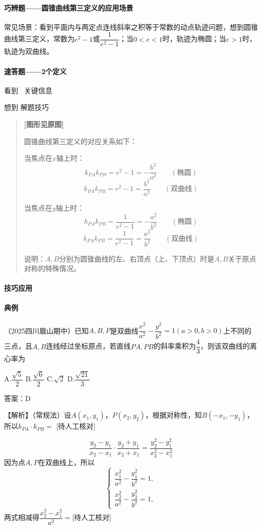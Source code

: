 \documentclass[UTF8,a4paper,11pt]{ctexart}
\begin{document}
\paragraph{巧辨题——圆锥曲线第三定义的应用场景}
常见场景：看到平面内与两定点连线斜率之积等于常数的动点轨迹问题，想到圆锥曲线第三定义，常数为$e^2-1$或$\dfrac{1}{e^2-1}$；当$0<e<1$时，轨迹为椭圆；当$e>1$时，轨迹为双曲线。

\paragraph{速答题——2个定义}
看到 \textbullet\ 关键信息

想到 解题技巧

\begin{quote}
\textbf{[图形见原图]}

圆锥曲线第三定义的对应关系如下：

当焦点在$x$轴上时：
\[
k_{PA}k_{PB}=e^2-1=-\frac{b^2}{a^2}\qquad(\text{椭圆})
\]
\[
k_{PA}k_{PB}=e^2-1=\frac{b^2}{a^2}\qquad(\text{双曲线})
\]

当焦点在$y$轴上时：
\[
k_{PA}k_{PB}=\frac{1}{e^2-1}=-\frac{a^2}{b^2}\qquad(\text{椭圆})
\]
\[
k_{PA}k_{PB}=\frac{1}{e^2-1}=\frac{a^2}{b^2}\qquad(\text{双曲线})
\]

说明：$A,B$分别为圆锥曲线的左、右顶点（上、下顶点）时是$A,B$关于原点对称的特殊情况。
\end{quote}

\paragraph{技巧应用}
\paragraph{典例}
（2025四川眉山期中）已知$A,B,P$是双曲线$\dfrac{x^2}{a^2}-\dfrac{y^2}{b^2}=1(a>0,b>0)$上不同的三点，且$A,B$连线经过坐标原点，若直线$PA,PB$的斜率乘积为$\dfrac{4}{3}$，则该双曲线的离心率为

A.$\dfrac{\sqrt{5}}{2}$ \qquad B.$\dfrac{\sqrt{6}}{2}$ \qquad C.$\sqrt{2}$ \qquad D.$\dfrac{\sqrt{21}}{3}$

答案：D

【解析】（常规法）设$A(x_1,y_1)$，$P(x_2,y_2)$，根据对称性，知$B(-x_1,-y_1)$，所以$k_{PA}\cdot k_{PB}=$
[待人工核对]

\[
\frac{y_2-y_1}{x_2-x_1}\cdot \frac{y_2+y_1}{x_2+x_1}=\frac{y_2^2-y_1^2}{x_2^2-x_1^2}
\]
因为点$A,P$在双曲线上，所以
\[
\begin{cases}
\dfrac{x_1^2}{a^2}-\dfrac{y_1^2}{b^2}=1,\\
\dfrac{x_2^2}{a^2}-\dfrac{y_2^2}{b^2}=1,
\end{cases}
\]
两式相减得$\dfrac{x_2^2-x_1^2}{a^2}=\text{[待人工核对]}$
\end{document}
